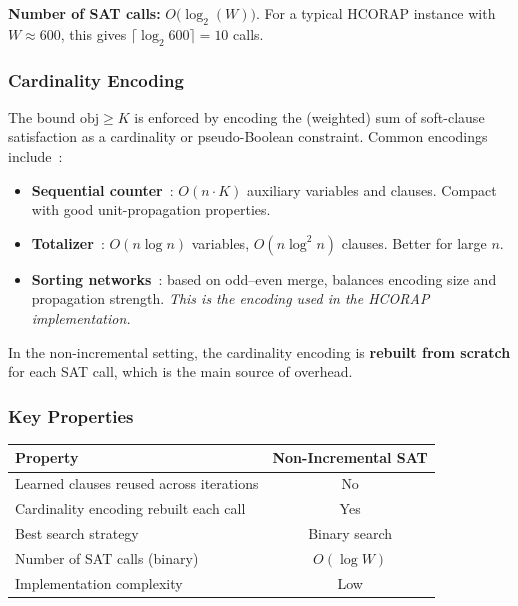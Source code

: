 \documentclass[11pt,a4paper]{article}
\begin{document}
\textbf{Number of SAT calls:}
$O\!\bigl(\log_2(W)\bigr)$.
For a typical HCORAP instance with $W \approx 600$, this gives
$\lceil \log_2 600 \rceil = 10$ calls.

\subsubsection{Cardinality Encoding}

The bound $\mathrm{obj} \ge K$ is enforced by encoding the (weighted) sum of
soft-clause satisfaction as a cardinality or pseudo-Boolean constraint.
Common encodings include~\cite{sinz2005cardinality,bailleux2003totalizer}:

\begin{itemize}
    \item \textbf{Sequential counter}~\cite{sinz2005cardinality}:
          $O(n \cdot K)$ auxiliary variables and clauses.  Compact with good
          unit-propagation properties.
    \item \textbf{Totalizer}~\cite{bailleux2003totalizer}:
          $O(n \log n)$ variables, $O(n \log^2 n)$ clauses.
          Better for large $n$.
    \item \textbf{Sorting networks}~\cite{asin2011cardinality}: based on
          odd--even merge, balances encoding size and propagation strength.
          \emph{This is the encoding used in the HCORAP implementation.}
\end{itemize}

In the non-incremental setting, the cardinality encoding is
\textbf{rebuilt from scratch} for each SAT call, which is the main
source of overhead.

\subsubsection{Key Properties}

\begin{center}
\begin{tabular}{lc}
\toprule
\textbf{Property} & \textbf{Non-Incremental SAT} \\
\midrule
Learned clauses reused across iterations & No \\
Cardinality encoding rebuilt each call   & Yes \\
Best search strategy                     & Binary search \\
Number of SAT calls (binary)             & $O(\log W)$ \\
Implementation complexity                & Low \\
\bottomrule
\end{tabular}
\end{center}
\end{document}
